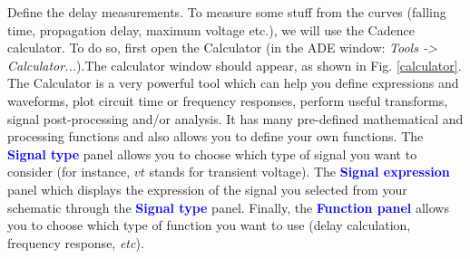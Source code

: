 \begin{enumerate}
{		\item Define the delay measurements. To measure some stuff from the curves (falling time, propagation delay, maximum voltage etc.), we will use the Cadence calculator. To do so, first open the Calculator (in the ADE window: \textit{Tools -> Calculator...}).The calculator window should appear, as shown in Fig. \ref{calculator}. The Calculator is a very powerful tool which can help you define expressions and waveforms, plot circuit time or frequency responses, perform useful transforms, signal post-processing and/or analysis. It has many pre-defined mathematical and processing functions and also allows you to define your own functions. \newline
		The \textbf{\textcolor{blue}{Signal type}} panel allows you to choose which type of signal you want to consider (for instance, $vt$ stands for transient voltage). The \textbf{\textcolor{blue}{Signal expression}} panel which displays the expression of the signal you selected from your schematic through the \textbf{\textcolor{blue}{Signal type}} panel. Finally, the \textbf{\textcolor{blue}{Function panel}} allows you to choose which type of function you want to use (delay calculation, frequency response, \textit{etc}). 
	}
	
	\clearpage
	

\end{enumerate}
